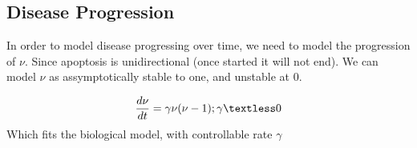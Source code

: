 \documentclass[11pt]{article}
\begin{document}
\subsection{Disease Progression}
In order to model disease progressing over time, we need to model the progression of $\nu$. Since apoptosis is unidirectional (once started it will not end). We can model $\nu$ as assymptotically stable to one, and unstable at 0.

\begin{align}
\frac{d\nu}{dt} = \gamma \nu(\nu -1); \gamma \textless 0
\end{align}
Which fits the biological model, with controllable rate $\gamma$
\end{document}
